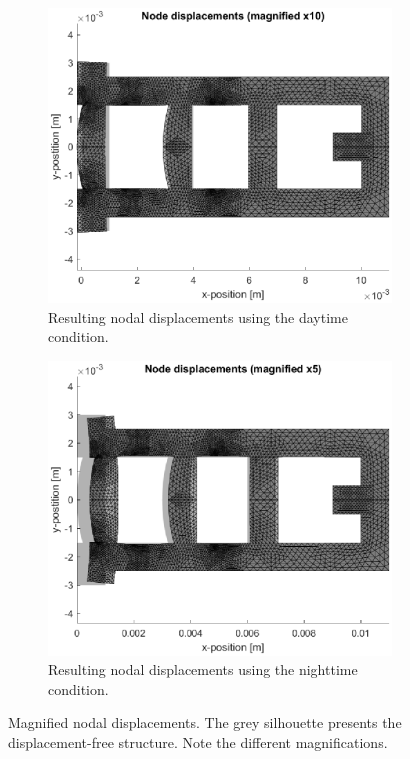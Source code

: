 \documentclass[a4paper,11pt]{article}
\begin{document}
\begin{figure}[H]
    \centering
    \begin{subfigure}{0.45\linewidth}{
        \centering
        \includegraphics[width=1\linewidth]{dDay.eps}
        \caption{Resulting nodal displacements using the daytime condition.}
        \label{sub:dday}
    }\end{subfigure}
    \begin{subfigure}{0.45\linewidth}{
        \centering
        \includegraphics[width=1\linewidth]{dNight.eps}
        \caption{Resulting nodal displacements using the nighttime condition.}
        \label{sub:dnight}
    }\end{subfigure}
    \caption{Magnified nodal displacements. The grey silhouette presents the displacement-free structure. Note the different magnifications.}
    \label{fig:d}
\end{figure}
\end{document}

